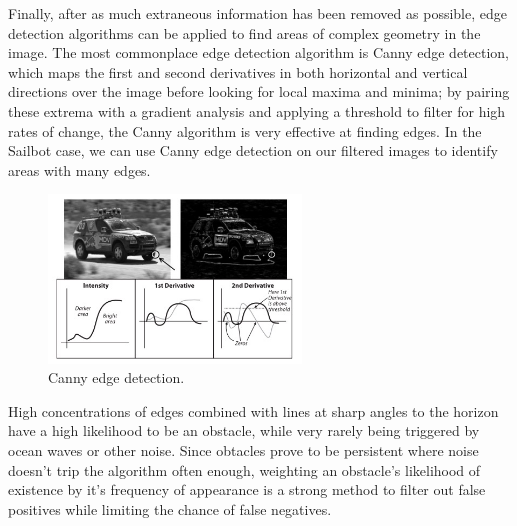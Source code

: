 Finally, after as much extraneous information has been removed as possible, edge detection algorithms can be applied to find areas of complex geometry in the image. The most commonplace edge detection algorithm is Canny edge detection, which maps the first and second derivatives in both horizontal and vertical directions over the image before looking for local maxima and minima; by pairing these extrema with a gradient analysis and applying a threshold to filter for high rates of change, the Canny algorithm is very effective at finding edges. In the Sailbot case, we can use Canny edge detection on our filtered images to identify areas with many edges. 
\begin{figure}
\centering
\includegraphics[width=0.6\textwidth]{"./image/canny"}
\caption{Canny edge detection.}
\label{fig:canny}
\end{figure}

High concentrations of edges combined with lines at sharp angles to the horizon have a high likelihood to be an obstacle, while very rarely being triggered by ocean waves or other noise. Since obtacles prove to be persistent where noise doesn't trip the algorithm often enough, weighting an obstacle's likelihood of existence by it's frequency of appearance is a strong method to filter out false positives while limiting the chance of false negatives.
